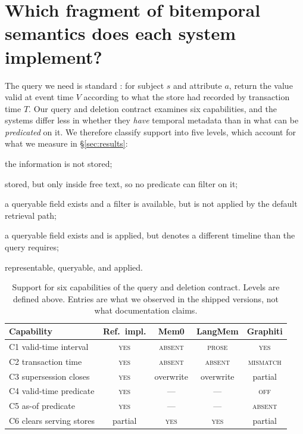 \documentclass[conference]{IEEEtran}
\begin{document}
\section{Which fragment of bitemporal semantics does each system implement?}
\label{sec:fragment}

The query we need is standard \citep{snodgrass1985}: for subject $s$ and
attribute $a$, return the value valid at event time $V$ according to what the
store had recorded by transaction time $T$. Our query and deletion contract
examines six capabilities, and the systems differ less in whether they \emph{have} temporal
metadata than in what can be \emph{predicated} on it. We therefore classify
support into five levels, which account for what we measure in
\S\ref{sec:results}:

\begin{description}
  \item[\textsc{absent}] the information is not stored;
  \item[\textsc{prose}] stored, but only inside free text, so no predicate can
        filter on it;
  \item[\textsc{off}] a queryable field exists and a filter is available, but is
        not applied by the default retrieval path;
  \item[\textsc{mismatch}] a queryable field exists and is applied, but denotes a
        different timeline than the query requires;
  \item[\textsc{yes}] representable, queryable, and applied.
\end{description}

\begin{table}[t]
\centering
\caption{Support for six capabilities of the query and deletion contract.
Levels are defined above. Entries are what we observed in the shipped versions,
not what documentation claims.}
\label{tab:fragment}
\footnotesize
\setlength{\tabcolsep}{3.5pt}
\begin{tabular}{@{}lcccc@{}}
\toprule
Capability & Ref.\ impl. & Mem0 & LangMem & Graphiti \\
\midrule
C1 valid-time interval    & \textsc{yes} & \textsc{absent} & \textsc{prose} & \textsc{yes} \\
C2 transaction time       & \textsc{yes} & \textsc{absent} & \textsc{absent} & \textsc{mismatch} \\
C3 supersession closes    & \textsc{yes} & overwrite & overwrite & partial \\
C4 valid-time predicate   & \textsc{yes} & --- & --- & \textsc{off} \\
C5 as-of predicate        & \textsc{yes} & --- & --- & \textsc{absent} \\
C6 clears serving stores & partial & \textsc{yes} & \textsc{yes} & partial \\
\bottomrule
\end{tabular}
\end{table}
\end{document}
